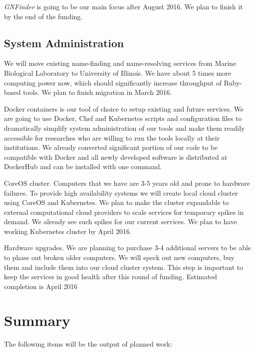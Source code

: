 \documentclass[11pt]{article}
\begin{document}
\textit{GNFinder} is going to be our main focus after August 2016. We plan to
finish it by the end of the funding.

\subsection{System Administration}

We will move existing name-finding \cite{resolver:gn} and name-resolving
\cite{gnrd} services from Marine Biological Laboratory to University of
Illinois. We have about 5 times more computing power now, which should
significantly increase throughput of Ruby-based tools. We plan to finish
migration in March 2016.

Docker containers is our tool of choice to setup existing and future services.
We are going to use Docker, Chef and Kubernetes scripts and configuration
files to dramatically simplify system administration of our tools and make
them readily accessible for researches who are willing to run the tools
locally at their institutions. We already converted significant portion of our
code to be compatible with Docker and all newly developed software is
distributed at DockerHub and can be installed with one command.

CoreOS cluster. Computers that we have are 3-5 years old and prone to hardware
failures. To provide high availability systems we will create local cloud
cluster using CoreOS and Kubernetes. We plan to make the cluster expandable to
external computational cloud providers to scale services for temporary spikes
in demand. We already see such spikes for our current services. We plan to have
working Kubernetes cluster by April 2016.

Hardware upgrades. We are planning to purchase 3-4 additional servers to be
able to phase out broken older computers. We will speck out new computers, buy
them and include them into our cloud cluster system. This step is important to
keep the services in good health after this round of funding. Estimated
completion is April 2016

\section{Summary}

The following items will be the output of planned work:
\end{document}
